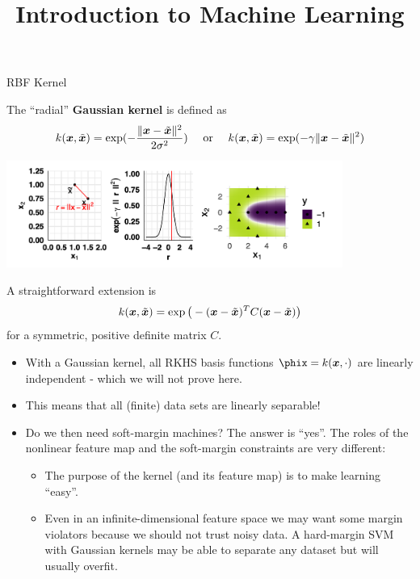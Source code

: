 




\newcommand{\titlefigure}{figure_man/non-lin-svm-rbf-as-basis.png}
\newcommand{\learninggoals}{
  \item \textcolor{blue}{XXX}
  \item \textcolor{blue}{XXX}
}

\title{Introduction to Machine Learning}
\date{}






\begin{vbframe}{RBF Kernel}

The \enquote{radial} \textbf{Gaussian kernel} is defined as
$$k(\bm{x}, \tilde {\bm{x}}) = \exp(-\frac{\|\bm{x} - \tilde {\bm{x}}\|^2}{2\sigma^2}) \quad \text{ or } \quad k(\bm{x}, \tilde {\bm{x}}) = \exp(-\gamma \|\bm{x} - \tilde {\bm{x}}\|^2)$$

\begin{center}
\includegraphics[width = 11cm ]{figure_man/rbf_kernel.png}
\end{center}

A straightforward extension is
$$k(\bm{x},  \tilde {\bm{x}}) = \exp\big(- (\bm{x} -  \tilde {\bm{x}})^T C (\bm{x} -  \tilde {\bm{x}})\big)$$
for a symmetric, positive definite matrix $C$.

\framebreak

  \begin{itemize}

    \item With a Gaussian kernel, all RKHS basis functions 
      $\phix = k(\xv, \cdot)$ are linearly independent - which we will not prove here.
    \item This means that all (finite) data sets are linearly separable!
    \item Do we then need soft-margin machines? 
      The answer is \enquote{yes}. The roles of the nonlinear feature map and the
    soft-margin constraints are very different:
    \begin{itemize}
      \item The purpose of the kernel (and its feature map) is to make learning
      \enquote{easy}.
\item Even in an infinite-dimensional feature space we may want some
      margin violators because we should not trust noisy data. A hard-margin
      SVM with Gaussian kernels may be able to separate any dataset but will usually overfit.
    \end{itemize}
  \end{itemize}
\end{vbframe}

